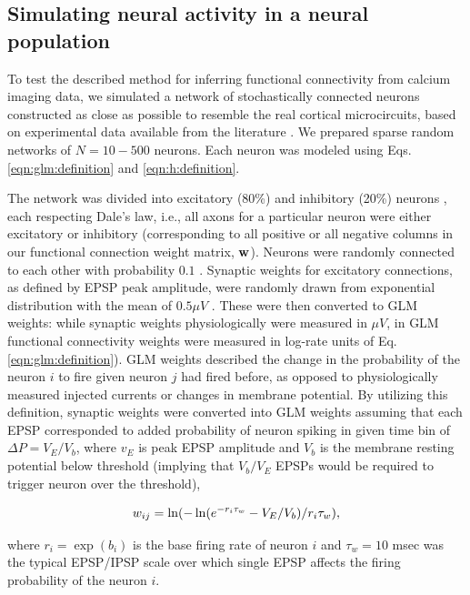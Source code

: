 \subsection{Simulating neural activity in a neural population} \label{sec:results:simulations}

To test the described method for inferring functional connectivity from calcium imaging data, we simulated a network of stochastically connected neurons constructed as close as possible to resemble the real cortical microcircuits, based on experimental data available from the literature \cite{Braitenberg1998, Urquijo2000, Lefort2009, Sayer1990}.  We prepared sparse random networks of $N=10-500$ neurons. Each neuron was modeled using Eqs. \ref{eqn:glm:definition} and \ref{eqn:h:definition}.

The network was divided into excitatory (80\%) and inhibitory (20\%) neurons \cite{Braitenberg1998, Urquijo2000}, each respecting Dale's law, i.e., all axons for a particular neuron were either excitatory or inhibitory (corresponding to all positive or all negative columns in our functional connection weight matrix, $\mathbf{w}$). Neurons were randomly connected to each other with probability $0.1$ \cite{Braitenberg1998, Lefort2009}.  Synaptic weights for excitatory connections, as defined by EPSP peak amplitude, were randomly drawn from exponential distribution with the mean of $0.5 \mu V$ \cite{Lefort2009, Sayer1990}. These were then converted to GLM weights: while synaptic weights physiologically were measured in $\mu V$, in GLM functional connectivity weights were measured in log-rate units of Eq. \ref{eqn:glm:definition}). GLM weights described the change in the probability of the neuron $i$ to fire given neuron $j$ had fired before, as opposed to physiologically measured injected currents or changes in membrane potential. By utilizing this definition, synaptic weights were converted into GLM weights assuming that each EPSP corresponded to added probability of neuron spiking in given time bin of $\Delta P = V_E/V_{b}$, where $v_E$ is peak EPSP amplitude and $V_b$ is the membrane resting potential below threshold (implying that $V_{b}/V_E$ EPSPs would be required to trigger neuron over the threshold),

\begin{equation}\label{eqn:convert}
\w_{ij}=\ln(-\ln(e^{-r_i\tau_w}-V_E/V_{b})/r_i\tau_w),
\end{equation}

\noindent where $r_i=\exp(b_i)$ is the base firing rate of neuron $i$ and $\tau_w=10$ msec was the typical EPSP/IPSP scale over which single EPSP affects the firing probability of the neuron $i$.  %
%

